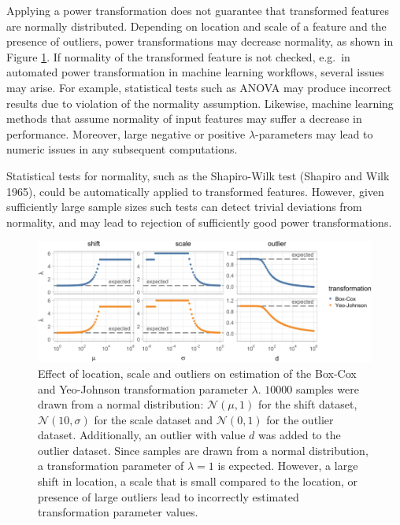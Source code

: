 \documentclass[
  a4paper,
]{article}
\begin{document}
Applying a power transformation does not guarantee that transformed
features are normally distributed. Depending on location and scale of a
feature and the presence of outliers, power transformations may decrease
normality, as shown in Figure \ref{fig:decreased-normality}. If
normality of the transformed feature is not checked, e.g.~in automated
power transformation in machine learning workflows, several issues may
arise. For example, statistical tests such as ANOVA may produce
incorrect results due to violation of the normality assumption.
Likewise, machine learning methods that assume normality of input
features may suffer a decrease in performance. Moreover, large negative
or positive \(\lambda\)-parameters may lead to numeric issues in any
subsequent computations.

Statistical tests for normality, such as the Shapiro-Wilk test (Shapiro
and Wilk 1965), could be automatically applied to transformed features.
However, given sufficiently large sample sizes such tests can detect
trivial deviations from normality, and may lead to rejection of
sufficiently good power transformations.

\begin{figure}

{\centering \includegraphics{manuscript_files/figure-latex/decreased-normality-1} 

}

\caption{Effect of location, scale and outliers on estimation of the Box-Cox and Yeo-Johnson transformation parameter $\lambda$. $10000$ samples were drawn from a normal distribution: $\mathcal{N}(\mu, 1)$ for the shift dataset, $\mathcal{N}(10, \sigma)$ for the scale dataset and $\mathcal{N}(0, 1)$ for the outlier dataset. Additionally, an outlier with value $d$ was added to the outlier dataset. Since samples are drawn from a normal distribution, a transformation parameter of $\lambda = 1$ is expected. However, a large shift in location, a scale that is small compared to the location, or presence of large outliers lead to incorrectly estimated transformation parameter values.}\label{fig:decreased-normality}
\end{figure}
\end{document}
